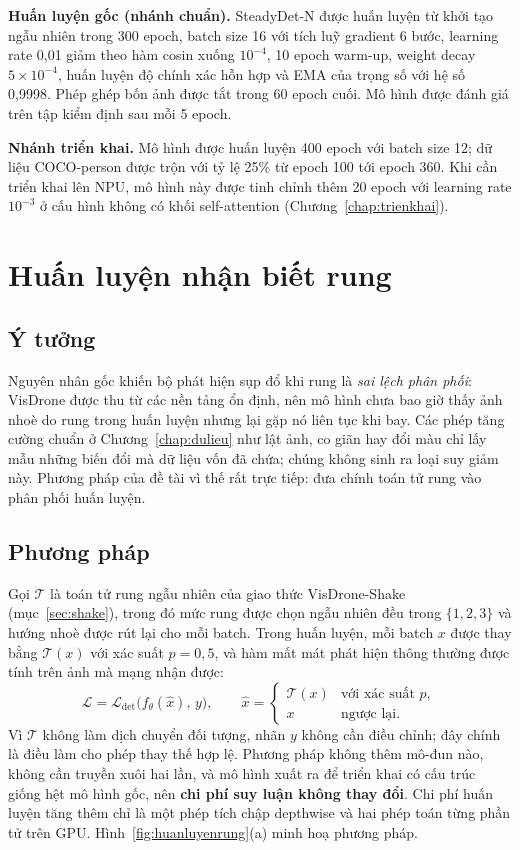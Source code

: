 \textbf{Huấn luyện gốc (nhánh chuẩn).} SteadyDet-N được huấn luyện từ khởi tạo ngẫu nhiên trong 300 epoch, batch size 16 với tích luỹ gradient 6 bước, learning rate 0,01 giảm theo hàm cosin xuống $10^{-4}$, 10 epoch warm-up, weight decay $5\times10^{-4}$, huấn luyện độ chính xác hỗn hợp và EMA của trọng số với hệ số 0,9998. Phép ghép bốn ảnh được tắt trong 60 epoch cuối. Mô hình được đánh giá trên tập kiểm định sau mỗi 5 epoch.

\textbf{Nhánh triển khai.} Mô hình được huấn luyện 400 epoch với batch size 12; dữ liệu COCO-person được trộn với tỷ lệ 25\% từ epoch 100 tới epoch 360. Khi cần triển khai lên NPU, mô hình này được tinh chỉnh thêm 20 epoch với learning rate $10^{-3}$ ở cấu hình không có khối self-attention (Chương~\ref{chap:trienkhai}).

\section{Huấn luyện nhận biết rung}
\label{sec:huanluyenrung}

\subsection{Ý tưởng}

Nguyên nhân gốc khiến bộ phát hiện sụp đổ khi rung là \textit{sai lệch phân phối}: VisDrone được thu từ các nền tảng ổn định, nên mô hình chưa bao giờ thấy ảnh nhoè do rung trong huấn luyện nhưng lại gặp nó liên tục khi bay. Các phép tăng cường chuẩn ở Chương~\ref{chap:dulieu} như lật ảnh, co giãn hay đổi màu chỉ lấy mẫu những biến đổi mà dữ liệu vốn đã chứa; chúng không sinh ra loại suy giảm này. Phương pháp của đề tài vì thế rất trực tiếp: đưa chính toán tử rung vào phân phối huấn luyện.

\subsection{Phương pháp}

Gọi $\mathcal{T}$ là toán tử rung ngẫu nhiên của giao thức VisDrone-Shake (mục~\ref{sec:shake}), trong đó mức rung được chọn ngẫu nhiên đều trong $\{1, 2, 3\}$ và hướng nhoè được rút lại cho mỗi batch. Trong huấn luyện, mỗi batch $x$ được thay bằng $\mathcal{T}(x)$ với xác suất $p = 0{,}5$, và hàm mất mát phát hiện thông thường được tính trên ảnh mà mạng nhận được:
\begin{equation}
\mathcal{L} = \mathcal{L}_{\det}\big(f_\theta(\hat{x}),\, y\big), \qquad
\hat{x} =
\begin{cases}
\mathcal{T}(x) & \text{với xác suất } p,\\
x & \text{ngược lại}.
\end{cases}
\label{eq:vibaware}
\end{equation}
Vì $\mathcal{T}$ không làm dịch chuyển đối tượng, nhãn $y$ không cần điều chỉnh; đây chính là điều làm cho phép thay thế hợp lệ. Phương pháp không thêm mô-đun nào, không cần truyền xuôi hai lần, và mô hình xuất ra để triển khai có cấu trúc giống hệt mô hình gốc, nên \textbf{chi phí suy luận không thay đổi}. Chi phí huấn luyện tăng thêm chỉ là một phép tích chập depthwise và hai phép toán từng phần tử trên GPU. Hình~\ref{fig:huanluyenrung}(a) minh hoạ phương pháp.

